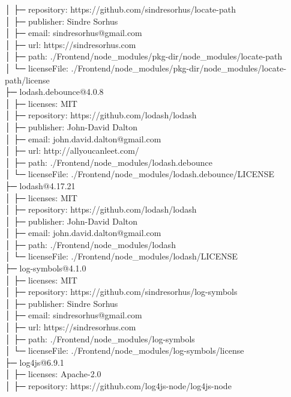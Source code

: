 │  ├─ repository: https://github.com/sindresorhus/locate-path\\
│  ├─ publisher: Sindre Sorhus\\
│  ├─ email: sindresorhus@gmail.com\\
│  ├─ url: https://sindresorhus.com\\
│  ├─ path: ./Frontend/node\_modules/pkg-dir/node\_modules/locate-path\\
│  └─ licenseFile: ./Frontend/node\_modules/pkg-dir/node\_modules/locate-path/license\\
├─ lodash.debounce@4.0.8\\
│  ├─ licenses: MIT\\
│  ├─ repository: https://github.com/lodash/lodash\\
│  ├─ publisher: John-David Dalton\\
│  ├─ email: john.david.dalton@gmail.com\\
│  ├─ url: http://allyoucanleet.com/\\
│  ├─ path: ./Frontend/node\_modules/lodash.debounce\\
│  └─ licenseFile: ./Frontend/node\_modules/lodash.debounce/LICENSE\\
├─ lodash@4.17.21\\
│  ├─ licenses: MIT\\
│  ├─ repository: https://github.com/lodash/lodash\\
│  ├─ publisher: John-David Dalton\\
│  ├─ email: john.david.dalton@gmail.com\\
│  ├─ path: ./Frontend/node\_modules/lodash\\
│  └─ licenseFile: ./Frontend/node\_modules/lodash/LICENSE\\
├─ log-symbols@4.1.0\\
│  ├─ licenses: MIT\\
│  ├─ repository: https://github.com/sindresorhus/log-symbols\\
│  ├─ publisher: Sindre Sorhus\\
│  ├─ email: sindresorhus@gmail.com\\
│  ├─ url: https://sindresorhus.com\\
│  ├─ path: ./Frontend/node\_modules/log-symbols\\
│  └─ licenseFile: ./Frontend/node\_modules/log-symbols/license\\
├─ log4js@6.9.1\\
│  ├─ licenses: Apache-2.0\\
│  ├─ repository: https://github.com/log4js-node/log4js-node\\

